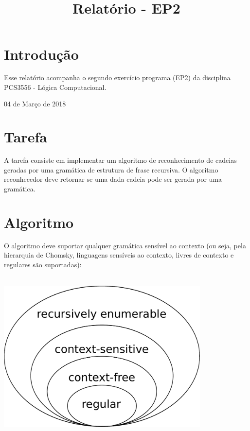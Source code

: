 \documentclass[conference]{IEEEtran}
\begin{document}
\title{Relatório - EP2}

\author{
}

\maketitle

\section{Introdução}
Esse relatório acompanha o segundo exercício programa (EP2) da disciplina PCS3556 - Lógica Computacional.

\hfill 04 de Março de 2018

\section{Tarefa}

A tarefa consiste em implementar um algoritmo de reconhecimento de cadeias geradas por uma gramática de estrutura de frase recursiva. O algoritmo reconhecedor deve retornar se uma dada cadeia pode ser gerada por uma gramática.

\section{Algoritmo}

O algoritmo deve suportar qualquer gramática sensível ao contexto (ou seja, pela hierarquia de Chomsky, linguagens sensíveis ao contexto, livres de contexto e regulares são suportadas):
\\
\\
\begin{minipage}{\linewidth}
    \centering
    \label{chomsky}
    \includegraphics[width=0.8\textwidth]{Chomsky-hierarchy.pdf}
\end{minipage}
\end{document}
